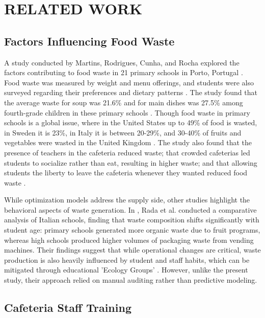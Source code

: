 \documentclass[journal]{IEEEtran}
\begin{document}
\section{RELATED WORK}

\subsection{Factors Influencing Food Waste}

A study conducted by Martins, Rodrigues, Cunha, and Rocha explored the factors contributing to food waste in 21 primary schools in Porto, Portugal \cite{factors}. Food waste was measured by weight and menu offerings, and students were also surveyed regarding their preferences and dietary patterns \cite{factors}. The study found that the average waste for soup was 21.6\% and for main dishes was 27.5\% among fourth-grade children in these primary schools \cite{factors}. Though food waste in primary schools is a global issue, where in the United States up to 49\% of food is wasted, in Sweden it is 23\%, in Italy it is between 20-29\%, and 30-40\% of fruits and vegetables were wasted in the United Kingdom \cite{factors}. The study also found that the presence of teachers in the cafeteria reduced waste; that crowded cafeterias led students to socialize rather than eat, resulting in higher waste; and that allowing students the liberty to leave the cafeteria whenever they wanted reduced food waste \cite{factors}.

While optimization models address the supply side, other studies highlight the behavioral aspects of waste generation. In \cite{rada}, Rada et al. conducted a comparative analysis of Italian schools, finding that waste composition shifts significantly with student age: primary schools generated more organic waste due to fruit programs, whereas high schools produced higher volumes of packaging waste from vending machines. Their findings suggest that while operational changes are critical, waste production is also heavily influenced by student and staff habits, which can be mitigated through educational 'Ecology Groups' \cite{rada}. However, unlike the present study, their approach relied on manual auditing rather than predictive modeling.

\subsection{Cafeteria Staff Training}
\end{document}
